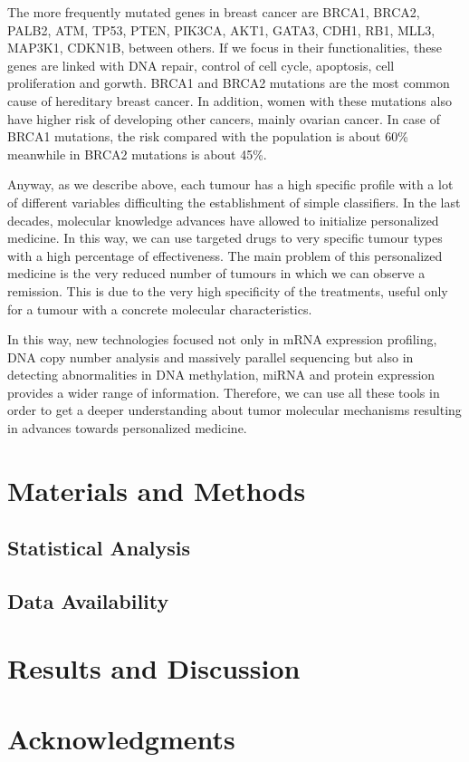 \documentclass[9pt,twocolumn,twoside]{gsajnl}
\begin{document}
The more frequently mutated genes in breast cancer are BRCA1, BRCA2, PALB2, ATM, TP53, PTEN, PIK3CA, AKT1, GATA3, CDH1, RB1, MLL3, MAP3K1, CDKN1B, between others\citep{acs}. If we focus in their functionalities, these genes are linked with DNA repair, control of cell cycle, apoptosis, cell proliferation and gorwth. BRCA1 and BRCA2 mutations are the most common cause of hereditary breast cancer\citep{acs}. In addition, women with these mutations also have higher risk of developing other cancers, mainly ovarian cancer\citep{acs}. In case of BRCA1 mutations, the risk compared with the population is about 60\% meanwhile in BRCA2 mutations is about 45\%\citep{acs}. 

Anyway, as we describe above, each tumour has a high specific profile with a lot of different variables difficulting the establishment of simple classifiers. In the last decades, molecular knowledge advances have allowed to initialize personalized medicine. In this way, we can use targeted drugs to very specific tumour types with a high percentage of effectiveness. The main problem of this personalized medicine is the very reduced number of tumours in which we can observe a remission. This is due to the very high specificity of the treatments, useful only for a tumour with a concrete molecular characteristics. 

In this way, new technologies focused not only in mRNA expression profiling, DNA copy number analysis and massively parallel sequencing but also in detecting abnormalities in DNA methylation, miRNA and protein expression provides a wider range of information\citep{cangen}. Therefore, we can use all these tools in order to get a deeper understanding about tumor molecular mechanisms resulting in advances towards personalized medicine.

\section*{Materials and Methods}


\subsection*{Statistical Analysis} 



\subsection*{Data Availability}


\section*{Results and Discussion}

\section*{Acknowledgments}


\end{document}
